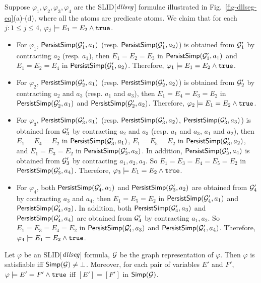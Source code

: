 \documentclass{llncs}
\begin{document}
\begin{example}
Suppose $\varphi_1,\varphi_2,\varphi_3,\varphi_4$ are the SLID[$\mathit{dllseg}$] formulae illustrated in Fig.~\ref{fig-dllseg-eq}(a)-(d), where all the atoms are predicate atoms. We claim that for each $j: 1 \le j \le 4$, $\varphi_j \models E_1 = E_2 \wedge \mathtt{true}$. 
\begin{itemize}
\item For $\varphi_1$,  ${\sf PersistSimp}(\mathcal{G}'_1, a_1)$ (resp. ${\sf PersistSimp}(\mathcal{G}'_1, a_2)$) is obtained from $\mathcal{G}'_1$ by contracting $a_2$ (resp. $a_1$), then $E_1 =E_2 =E_3$   in  ${\sf PersistSimp}(\mathcal{G}'_1, a_1)$ and $E_1= E_2= E_4$ in ${\sf PersistSimp}(\mathcal{G}'_1,a_2)$. Therefore, $\varphi_1 \models E_1 = E_2 \wedge \mathtt{true}$.
%
\item  For $\varphi_2$,  ${\sf PersistSimp}(\mathcal{G}'_2, a_1)$ (resp. ${\sf PersistSimp}(\mathcal{G}'_2, a_2)$) is obtained from $\mathcal{G}'_2$ by contracting $a_2$ and $a_3$ (resp. $a_1$ and $a_3$), then $E_1 = E_4 = E_3 = E_2$ in  ${\sf PersistSimp}(\mathcal{G}'_2, a_1)$ and ${\sf PersistSimp}(\mathcal{G}'_2,a_2)$. Therefore, $\varphi_2 \models E_1 = E_2 \wedge \mathtt{true}$.
%
\item  For $\varphi_3$,  ${\sf PersistSimp}(\mathcal{G}'_3, a_1)$ (resp. ${\sf PersistSimp}(\mathcal{G}'_3, a_2)$, ${\sf PersistSimp}(\mathcal{G}'_3, a_3)$) is obtained from $\mathcal{G}'_3$ by contracting $a_2$ and $a_3$ (resp. $a_1$ and $a_3$, $a_1$ and $a_2$), then $E_1 = E_4 = E_2$ in  ${\sf PersistSimp}(\mathcal{G}'_3, a_1)$, $E_1=E_5 = E_2$ in ${\sf PersistSimp}(\mathcal{G}'_3,a_2)$, and $E_1=E_3 = E_2$ in ${\sf PersistSimp}(\mathcal{G}'_3,a_3)$. In addition, ${\sf PersistSimp}(\mathcal{G}'_3, a_4)$ is obtained from $\mathcal{G}'_3$ by  contracting $a_1,a_2,a_3$. So $E_1 = E_3 = E_4 = E_5 = E_2$ in ${\sf PersistSimp}(\mathcal{G}'_3, a_4)$.  Therefore, $\varphi_3 \models E_1 = E_2 \wedge \mathtt{true}$.
%
\item  For $\varphi_4$,  both ${\sf PersistSimp}(\mathcal{G}'_4, a_1)$ and ${\sf PersistSimp}(\mathcal{G}'_3, a_2)$ are obtained from $\mathcal{G}'_4$ by contracting $a_3$ and $a_4$, then $E_1 = E_5 = E_2$ in  ${\sf PersistSimp}(\mathcal{G}'_4, a_1)$ and ${\sf PersistSimp}(\mathcal{G}'_4, a_2)$. In addition, both ${\sf PersistSimp}(\mathcal{G}'_4, a_3)$ and ${\sf PersistSimp}(\mathcal{G}'_4, a_4)$ are obtained from $\mathcal{G}'_4$ by  contracting $a_1,a_2$. So $E_1 = E_3 = E_4 = E_2$ in ${\sf PersistSimp}(\mathcal{G}'_4, a_3)$ and ${\sf PersistSimp}(\mathcal{G}'_4, a_4)$.  Therefore, $\varphi_4 \models E_1 = E_2 \wedge \mathtt{true}$.
\end{itemize}
\end{example}


\medskip

\begin{lemma}
Let $\varphi$ be an SLID[$\mathit{dllseg}$] formula, $\mathcal{G}$ be the graph representation of $\varphi$. Then $\varphi$ is satisfiable iff ${\sf Simp}(\mathcal{G}) \neq \bot$. Moreover, for each pair of variables $E'$ and $F'$, $\varphi \models E' = F' \wedge \mathtt{true}$ iff $[E']=[F']$ in ${\sf Simp}(\mathcal{G})$.
\end{lemma}
\end{document}
